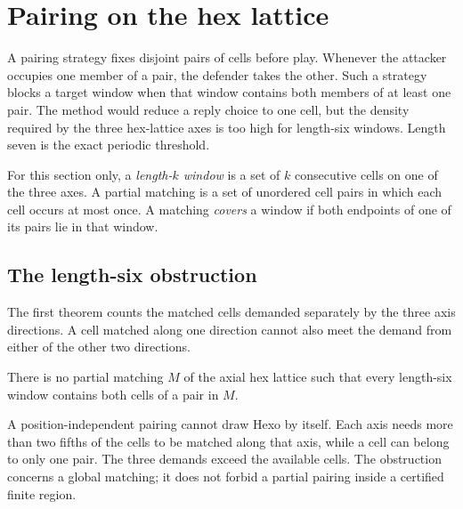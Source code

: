 \section{Pairing on the hex lattice}
\label{sec:pairing}

A pairing strategy fixes disjoint pairs of cells before play.  Whenever the
attacker occupies one member of a pair, the defender takes the other.  Such a
strategy blocks a target window when that window contains both members of at
least one pair.  The method would reduce a reply choice to one cell, but the
density required by the three hex-lattice axes is too high for length-six
windows.  Length seven is the exact periodic threshold.

For this section only, a \emph{length-$k$ window} is a set of $k$ consecutive
cells on one of the three axes.  A partial matching is a set of unordered cell
pairs in which each cell occurs at most once.  A matching \emph{covers} a
window if both endpoints of one of its pairs lie in that window.

\subsection{The length-six obstruction}

The first theorem counts the matched cells demanded separately by the three
axis directions.  A cell matched along one direction cannot also meet the
demand from either of the other two directions.

\begin{theorem}[No pairing]
\label{thm:T8}
There is no partial matching $M$ of the axial hex lattice such that every
length-six window contains both cells of a pair in $M$.
\end{theorem}

\begin{plainterms}
A position-independent pairing cannot draw Hexo by itself.  Each axis needs
more than two fifths of the cells to be matched along that axis, while a cell
can belong to only one pair.  The three demands exceed the available cells.
The obstruction concerns a global matching; it does not forbid a partial
pairing inside a certified finite region.
\end{plainterms}

